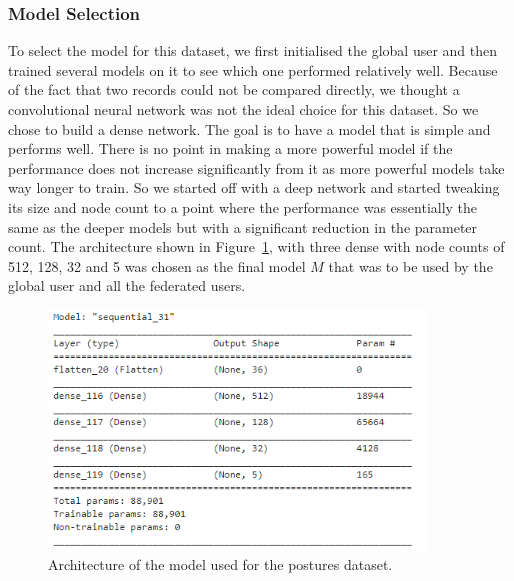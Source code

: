 \documentclass[12pt]{article}
\newcommand{\forcond}[2]{#1 \KwTo #2}
\begin{document}
%	    
\subsubsection{Model Selection}
To select the model for this dataset, we first initialised the global user and then trained several models on it to see which one performed relatively well. Because of the fact that two records could not be compared directly, we thought a convolutional neural network was not the ideal choice for this dataset. So we chose to build a dense network. The goal is to have a model that is simple and performs well. There is no point in making a more powerful model if the performance does not increase significantly from it as more powerful models take way longer to train. So we started off with a deep network and started tweaking its size and node count to a point where the performance was essentially the same as the deeper models but with a significant reduction in the parameter count. The architecture shown in Figure~\ref{fig:posture_model}, with three dense with node counts of 512, 128, 32 and 5 was chosen as the final model $M$ that was to be used by the global user and all the federated users. 
\begin{figure}[H]
	\centering
	\includegraphics[width=10cm]{resources/posture_model.png}
	\caption{Architecture of the model used for the postures dataset.}
	\label{fig:posture_model}
\end{figure}
\end{document}
